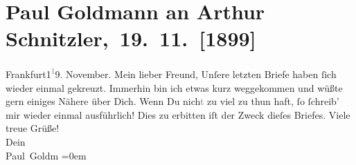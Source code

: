

         
         \renewcommand{\erwaehntePersonen}{Personen: Paul Goldmann}
         \renewcommand{\erwaehnteOrte}{Orte: Frankfurt am Main, Wien}
         \renewcommand{\erwaehnteWerke}{}
               \section[ Paul Goldmann an Arthur Schnitzler, 19. 11. {[}1899{]}]{ Paul Goldmann an Arthur Schnitzler, 19. 11. {[}1899{]}}\nopagebreak{}\rehead{ }\begin{ledgroupsized}[t]{13cm}\normalsize\beginnumbering \toendnotes[C]{\smallbreak\pagebreak[2]} 
\pstart
           \centering{}{\pb}Frankfurt1\substVorne{}\textsuperscript{\textcolor{gray}{1}}\substDazwischen{}9\substHinten{}. November.\pend
           \pstart\center{}Mein lieber Freund,\pend\pstart
           Unſer\strikeout{\textcolor{gray}{l}}e letzten Briefe haben ſich wieder einmal gekreuzt.\pend
           \pstart
           Immerhin bin ich etwas kurz weggekommen und wüßte gern einiges Nähere über Dich.\pend
           \pstart
           Wenn Du nich\textcolor{gray}{t}{ }\strikeout{\textcolor{gray}{D}} zu viel zu thun haft, ſo ſchreib’ mir wieder einmal ausführlich!\pend
           \pstart
           Dies zu erbitten iſt der Zweck dieſes Briefes.\pend
           \pstart
           Viele treue Grüße! {\\[\baselineskip]}Dein {\\[\baselineskip]}\spacefill\mbox{Paul Goldm}\pend
           \leftskip=0em{}
         
         \endnumbering{}\end{ledgroupsized}  \newcommand{\dateiname}{L02894}\newcommand{\titel}{Paul Goldmann an Arthur Schnitzler, 19. 11. [1899]}\newcommand{\editorInnen}{Martin Anton Müller und Laura Untner}
      